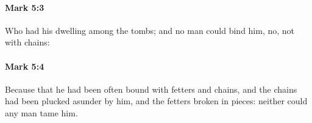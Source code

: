 		\paragraph{Mark 5:3} %
			\label{MARK-5-3}

			Who had his dwelling among the tombs; and no man could bind him, no, not with chains:

			\begin{framed}
			\scriptsize
				\begin{compactdesc}
					\item[SBLG] 
				\end{compactdesc}
			\end{framed}

		\paragraph{Mark 5:4} %
			\label{MARK-5-4}

			Because that he had been often bound with fetters and chains, and the chains had been plucked asunder by him, and the fetters broken in pieces: neither could any man tame him.

